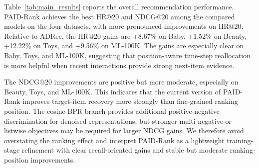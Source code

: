 \documentclass[runningheads,a4paper]{llncs}
\begin{document}
Table~\ref{tab:main_results} reports the overall recommendation performance. PAID-Rank achieves the best HR@20 and NDCG@20 among the compared models on the four datasets, with more pronounced improvements on HR@20. Relative to ADRec, the HR@20 gains are +8.67\% on Baby, +1.52\% on Beauty, +12.22\% on Toys, and +9.56\% on ML-100K. The gains are especially clear on Baby, Toys, and ML-100K, suggesting that position-aware time-step reallocation is more helpful when recent interactions provide strong next-item evidence.

The NDCG@20 improvements are positive but more moderate, especially on Beauty, Toys, and ML-100K. This indicates that the current version of PAID-Rank improves target-item recovery more strongly than fine-grained ranking position. The cosine-BPR branch provides additional positive-negative discrimination for denoised representations, but stronger multi-negative or listwise objectives may be required for larger NDCG gains. We therefore avoid overstating the ranking effect and interpret PAID-Rank as a lightweight training-stage refinement with clear recall-oriented gains and stable but moderate ranking-position improvements.
\end{document}
